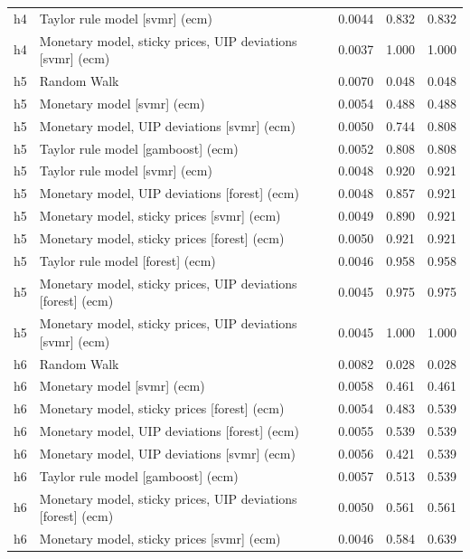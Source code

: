 \begin{ThreePartTable}
\begin{longtable}[t]{cp{5.5cm}ccc}
h4 & \raggedright Taylor rule model [svmr] (ecm) & 0.0044 & 0.832 & 0.832\\
h4 & \raggedright Monetary model, sticky prices, UIP deviations [svmr] (ecm) & 0.0037 & 1.000 & 1.000\\
\addlinespace
h5 & \raggedright Random Walk & 0.0070 & 0.048 & 0.048\\
h5 & \raggedright Monetary model [svmr] (ecm) & 0.0054 & 0.488 & 0.488\\
h5 & \raggedright Monetary model, UIP deviations [svmr] (ecm) & 0.0050 & 0.744 & 0.808\\
h5 & \raggedright Taylor rule model [gamboost] (ecm) & 0.0052 & 0.808 & 0.808\\
h5 & \raggedright Taylor rule model [svmr] (ecm) & 0.0048 & 0.920 & 0.921\\
h5 & \raggedright Monetary model, UIP deviations [forest] (ecm) & 0.0048 & 0.857 & 0.921\\
h5 & \raggedright Monetary model, sticky prices [svmr] (ecm) & 0.0049 & 0.890 & 0.921\\
h5 & \raggedright Monetary model, sticky prices [forest] (ecm) & 0.0050 & 0.921 & 0.921\\
h5 & \raggedright Taylor rule model [forest] (ecm) & 0.0046 & 0.958 & 0.958\\
h5 & \raggedright Monetary model, sticky prices, UIP deviations [forest] (ecm) & 0.0045 & 0.975 & 0.975\\
h5 & \raggedright Monetary model, sticky prices, UIP deviations [svmr] (ecm) & 0.0045 & 1.000 & 1.000\\
\addlinespace
h6 & \raggedright Random Walk & 0.0082 & 0.028 & 0.028\\
h6 & \raggedright Monetary model [svmr] (ecm) & 0.0058 & 0.461 & 0.461\\
h6 & \raggedright Monetary model, sticky prices [forest] (ecm) & 0.0054 & 0.483 & 0.539\\
h6 & \raggedright Monetary model, UIP deviations [forest] (ecm) & 0.0055 & 0.539 & 0.539\\
h6 & \raggedright Monetary model, UIP deviations [svmr] (ecm) & 0.0056 & 0.421 & 0.539\\
h6 & \raggedright Taylor rule model [gamboost] (ecm) & 0.0057 & 0.513 & 0.539\\
h6 & \raggedright Monetary model, sticky prices, UIP deviations [forest] (ecm) & 0.0050 & 0.561 & 0.561\\
h6 & \raggedright Monetary model, sticky prices [svmr] (ecm) & 0.0046 & 0.584 & 0.639\\

\end{longtable}
\end{ThreePartTable}
